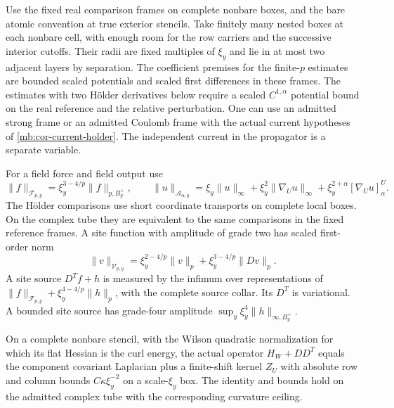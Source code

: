 \documentclass[11pt,letterpaper,reqno]{amsart}
\makeatletter
\numberwithin{equation}{section}
\theoremstyle{definition}
\newcommand{\ms@minorstart}{%
  \pushQED{\qed}\renewcommand{\qedsymbol}{$\blacksquare$}}
\newenvironment{lemma}[1][]{\ms@minorstart\ms@lemma[#1]}
  {\popQED\endms@lemma}
\theoremstyle{remark}
\makeatother
\begin{document}
Use the fixed real comparison frames on complete nonbare boxes, and the bare atomic convention at true exterior stencils. Take finitely many nested boxes at each nonbare cell, with enough room for the row carriers and the successive interior cutoffs. Their radii are fixed multiples of \(\xi_y\) and lie in at most two adjacent layers by separation. The coefficient premises for the finite-\(p\) estimates are bounded scaled potentials and scaled first differences in these frames. The estimates with two H\"older derivatives below require a scaled \(C^{1,\alpha}\) potential bound on the real reference and the relative perturbation. One can use an admitted strong frame or an admitted Coulomb frame with the actual current hypotheses of \cref{mb:cor-current-holder}. The independent current in the propagator is a separate variable.

For a field force and field output use
\[
 \|f\|_{\mathcal F_{p,y}}=\xi_y^{3-4/p}\|f\|_{p,B_y^+},\qquad
 \|u\|_{\mathcal A_{\alpha,y}}=
     \xi_y\|u\|_\infty+\xi_y^2\|\nabla_Uu\|_\infty+
                   \xi_y^{2+\alpha}[\nabla_Uu]_\alpha^U .
\]
The H\"older comparisons use short coordinate transports on complete local boxes. On the complex tube they are equivalent to the same comparisons in the fixed reference frames. A site function with amplitude of grade two has scaled first-order norm
\[
 \|v\|_{\mathcal V_{p,y}}=
      \xi_y^{2-4/p}\|v\|_p+\xi_y^{3-4/p}\|Dv\|_p .
\]
A site source \(D^Tf+h\) is measured by the infimum over representations of \(\|f\|_{\mathcal F_{p,y}}+\xi_y^{4-4/p}\|h\|_p\), with the complete source collar. Its \(D^T\) is variational. A bounded site source has grade-four amplitude \(\sup_y\xi_y^4\|h\|_{\infty,B_y^+}\).

\begin{lemma}[The interior Wilson stencil]
\label{mb:lem-wilson-component-stencil}
On a complete nonbare stencil, with the Wilson quadratic normalization for which its flat Hessian is the curl energy, the actual operator \(H_W+DD^T\) equals the component covariant Laplacian plus a finite-shift kernel \(Z_U\) with absolute row and column bounds \(C\kappa\xi_y^{-2}\) on a scale-\(\xi_y\) box. The identity and bounds hold on the admitted complex tube with the corresponding curvature ceiling.
\end{lemma}
\end{document}
